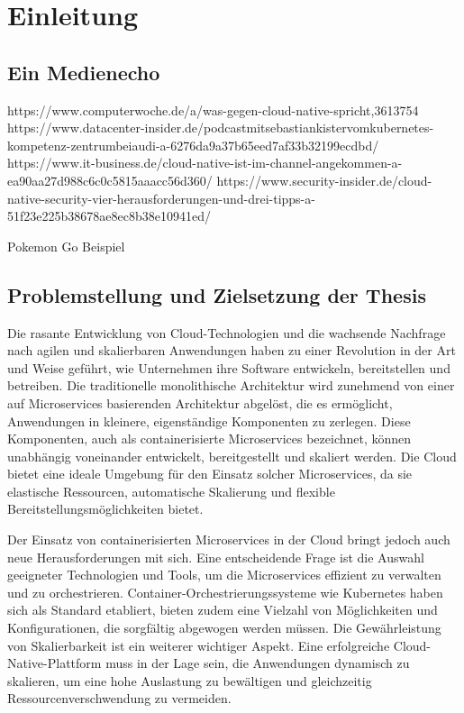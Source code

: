 \newpage
\section{Einleitung}
\subsection{Ein Medienecho}
https://www.computerwoche.de/a/was-gegen-cloud-native-spricht,3613754
https://www.datacenter-insider.de/podcastmitsebastiankistervomkubernetes-kompetenz-zentrumbeiaudi-a-6276da9a37b65eed7af33b32199ecdbd/
https://www.it-business.de/cloud-native-ist-im-channel-angekommen-a-ea90aa27d988c6c0c5815aaacc56d360/
https://www.security-insider.de/cloud-native-security-vier-herausforderungen-und-drei-tipps-a-51f23e225b38678ae8ec8b38e10941ed/

Pokemon Go Beispiel
\subsection{Problemstellung und Zielsetzung der Thesis}
Die rasante Entwicklung von Cloud-Technologien und die wachsende Nachfrage nach agilen und skalierbaren Anwendungen haben zu einer Revolution in der Art und Weise geführt, wie Unternehmen ihre Software entwickeln, bereitstellen und betreiben. Die traditionelle monolithische Architektur wird zunehmend von einer auf Microservices basierenden Architektur abgelöst, die es ermöglicht, Anwendungen in kleinere, eigenständige Komponenten zu zerlegen. Diese Komponenten, auch als containerisierte Microservices bezeichnet, können unabhängig voneinander entwickelt, bereitgestellt und skaliert werden. Die Cloud bietet eine ideale Umgebung für den Einsatz solcher Microservices, da sie elastische Ressourcen, automatische Skalierung und flexible Bereitstellungsmöglichkeiten bietet.

Der Einsatz von containerisierten Microservices in der Cloud bringt jedoch auch neue Herausforderungen mit sich. Eine entscheidende Frage ist die Auswahl geeigneter Technologien und Tools, um die Microservices effizient zu verwalten und zu orchestrieren. Container-Orchestrierungssysteme wie Kubernetes haben sich als Standard etabliert, bieten zudem eine Vielzahl von Möglichkeiten und Konfigurationen, die sorgfältig abgewogen werden müssen. Die Gewährleistung von Skalierbarkeit ist ein weiterer wichtiger Aspekt. Eine erfolgreiche Cloud-Native-Plattform muss in der Lage sein, die Anwendungen dynamisch zu skalieren, um eine hohe Auslastung zu bewältigen und gleichzeitig Ressourcenverschwendung zu vermeiden.

